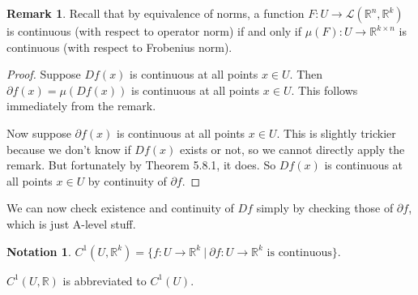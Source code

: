 \documentclass[a4paper]{article}
\theoremstyle{definition}
\newtheorem*{remark}{Remark}
\newtheorem*{notation}{Notation}
\begin{document}
\begin{remark}
Recall that by equivalence of norms, a function $F:U\rightarrow \mathcal L(\mathbb R^n,\mathbb R^k)$ is continuous (with respect to operator norm) if and only if $\mu(F):U\rightarrow \mathbb R^{k\times n}$ is continuous (with respect to Frobenius norm).
\end{remark}
\begin{proof}
Suppose $Df(x)$ is continuous at all points $x\in U$. Then $\partial f(x) = \mu (Df(x))$ is continuous at all points $x\in U$. This follows immediately from the remark.

Now suppose $\partial f(x)$ is continuous at all points $x\in U$. This is slightly trickier because we don't know if $Df(x)$ exists or not, so we cannot directly apply the remark. But fortunately by Theorem 5.8.1, it does. So $Df(x)$ is continuous at all points $x\in U$ by continuity of $\partial f$.
\end{proof}
We can now check existence and continuity of $Df$ simply by checking those of $\partial f$, which is just A-level stuff.
\begin{notation}
$C^1(U,\mathbb R^k) = \{f:U\rightarrow \mathbb R^k \ |\  \partial f:U\rightarrow \mathbb R^k\text{ is continuous}\}$.

$C^1(U,\mathbb R)$ is abbreviated to $C^1(U)$.
\end{notation}
\end{document}
